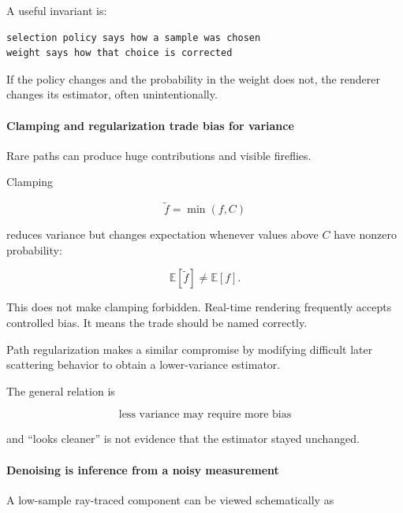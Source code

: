 A useful invariant is:

\begin{verbatim}
selection policy says how a sample was chosen
weight says how that choice is corrected
\end{verbatim}

If the policy changes and the probability in the weight does not, the renderer changes its estimator, often unintentionally.

\paragraph{Clamping and regularization trade bias for variance}\label{03-visual-computing-i-ch001-clamping-and-regularization-trade-bias-for-variance}

\hypertarget{03-visual-computing-i-ch001-clamping-and-regularization-trade-bias-for-variance}{}

Rare paths can produce huge contributions and visible fireflies.

Clamping

\[
\widetilde f=\min(f,C)
\]

reduces variance but changes expectation whenever values above \(C\) have nonzero probability:

\[
\mathbb E[\widetilde f]\neq\mathbb E[f].
\]

This does not make clamping forbidden. Real-time rendering frequently accepts controlled bias. It means the trade should be named correctly.

Path regularization makes a similar compromise by modifying difficult later scattering behavior to obtain a lower-variance estimator.

The general relation is

\[
\boxed{
\text{less variance may require more bias}
}
\]

and ``looks cleaner'' is not evidence that the estimator stayed unchanged.

\paragraph{Denoising is inference from a noisy measurement}\label{03-visual-computing-i-ch001-denoising-is-inference-from-a-noisy-measurement}

\hypertarget{03-visual-computing-i-ch001-denoising-is-inference-from-a-noisy-measurement}{}

A low-sample ray-traced component can be viewed schematically as

